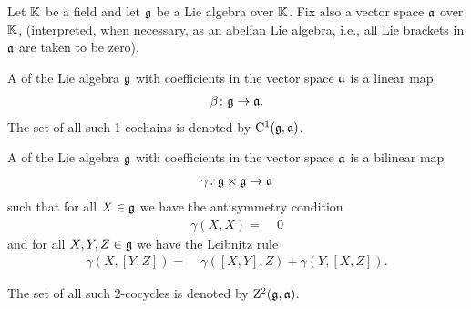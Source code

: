 
Let $\mathbb{K}$ be a field and let $\mathfrak{g}$ be a Lie algebra over $\mathbb{K}$.
Fix also a vector space $\mathfrak{a}$ over $\mathbb{K}$, (interpreted, when necessary,
as an abelian Lie algebra, i.e., all Lie brackets in $\mathfrak{a}$ are taken to
be zero).

\begin{definition}
  \label{def:LieOneCochain}
  \leanok
  A  of the Lie algebra $\mathfrak{g}$ with coefficients in the vector
  space $\mathfrak{a}$ is a linear map
  \begin{align*}
    \beta \colon \mathfrak{g} \to \mathfrak{a} .
  \end{align*}
  The set of all such 1-cochains is denoted by $\mathrm{C}^1(\mathfrak{g}, \mathfrak{a})$.
\end{definition}

\begin{definition}
  \label{def:LieTwoCocycle}
  \leanok
  A  of the Lie algebra $\mathfrak{g}$ with coefficients in the vector
  space $\mathfrak{a}$ is a bilinear map
  \begin{align*}
    \gamma \colon \mathfrak{g} \times \mathfrak{g} \to \mathfrak{a}
  \end{align*}
  such that for all $X \in \mathfrak{g}$ we have the antisymmetry condition
  \begin{align}\label{eq:LieTwoCocycle.self}
    \gamma(X,X) = \; & 0
  \end{align}
  and for all $X,Y,Z \in \mathfrak{g}$ we have the Leibnitz rule
  \begin{align}\label{eq:LieTwoCocycle.leibniz}
    \gamma(X,[Y,Z]) = \; & \gamma([X,Y],Z) + \gamma(Y,[X,Z]) .
  \end{align}

  The set of all such 2-cocycles is denoted by $\mathrm{Z}^2(\mathfrak{g}, \mathfrak{a})$.
\end{definition}


